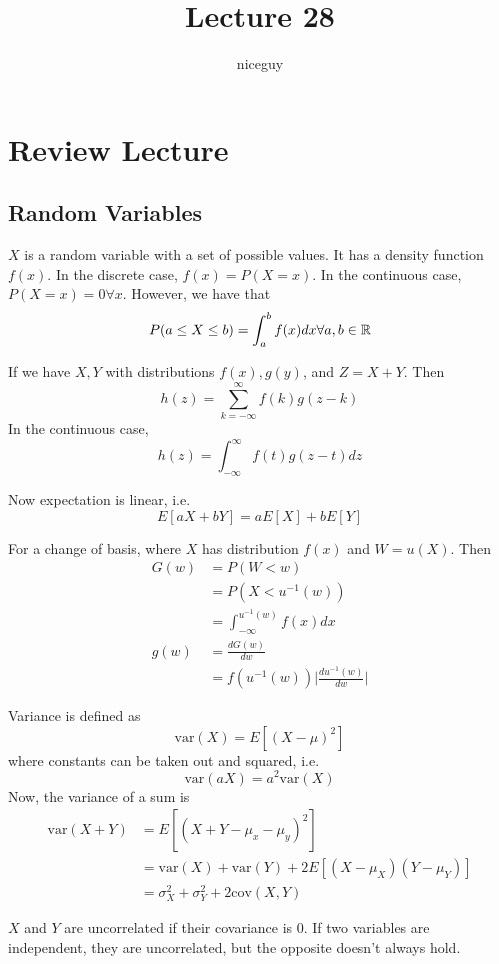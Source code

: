 \documentclass[12pt]{article}
\author{niceguy}
\title{Lecture 28}
\begin{document}
\maketitle

\section{Review Lecture}

\subsection{Random Variables}

$X$ is a random variable with a set of possible values. It has a density function $f(x)$. In the discrete case, $f(x) = P(X=x)$. In the continuous case, $P(X=x)=0 \forall x$. However, we have that
$$P(a \leq X \leq b) = \int_a^b f(x)dx \forall a,b \in \mathbb{R}$$

If we have $X,Y$ with distributions $f(x),g(y)$, and $Z=X+Y$. Then
$$h(z) = \sum_{k=-\infty}^\infty f(k)g(z-k)$$
In the continuous case,
$$h(z) = \int_{-\infty}^\infty f(t)g(z-t)dz$$

Now expectation is linear, i.e.
$$E[aX+bY] = aE[X] + bE[Y]$$

For a change of basis, where $X$ has distribution $f(x)$ and $W=u(X)$. Then
\begin{align*}
	G(w) &= P(W < w) \\
	     &= P(X < u^{-1}(w)) \\
	     &= \int_{-\infty}^{u^{-1}(w)} f(x)dx \\
	g(w) &= \frac{dG(w)}{dw} \\
	     &= f(u^{-1}(w)) \Bigg | \frac{du^{-1}(w)}{dw} \Bigg |
\end{align*}

Variance is defined as
$$\text{var}(X) = E[(X-\mu)^2]$$
where constants can be taken out and squared, i.e.
$$\text{var}(aX) = a^2\text{var}(X)$$
Now, the variance of a sum is
\begin{align*}
	\text{var}(X+Y) &= E[(X+Y-\mu_x-\mu_y)^2] \\
			&= \text{var}(X) + \text{var}(Y) + 2E[(X-\mu_X)(Y-\mu_Y)] \\
			&= \sigma_X^2 + \sigma_Y^2 + 2\text{cov}(X,Y)
\end{align*}


$X$ and $Y$ are uncorrelated if their covariance is 0. If two variables are independent, they are uncorrelated, but the opposite doesn't always hold.
\end{document}
